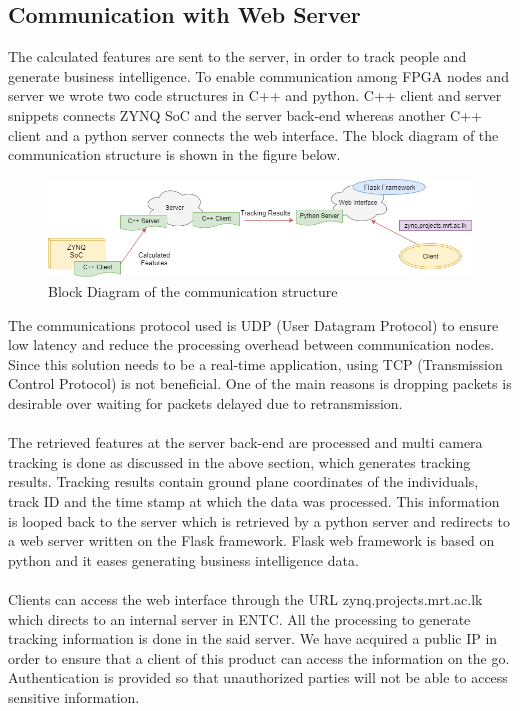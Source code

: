 \documentclass[12pt,a4paper]{report}
\begin{document}
\subsection{Communication with Web Server}
The calculated features are sent to the server, in order to track people and generate business intelligence. To enable communication among FPGA nodes and server we wrote two code structures in C++ and python. C++ client and server snippets connects ZYNQ SoC and the server back-end whereas another C++ client and a python server connects the web interface. The block diagram of the communication structure is shown in the figure below.
\begin{figure}[H]
\includegraphics[width=\textwidth]{comm.png}
\centering
\caption{Block Diagram of the communication structure}
\label{flask}
\end{figure}
The communications protocol used is UDP (User Datagram Protocol) to ensure low latency and reduce the processing overhead between communication nodes. Since this solution needs to be a real-time application, using TCP (Transmission Control Protocol) is not beneficial. One of the main reasons is dropping packets is desirable over waiting for packets delayed due to retransmission.\\\\
The retrieved features at the server back-end are processed and multi camera tracking is done as discussed in the above section, which generates tracking results. Tracking results contain ground plane coordinates of the individuals, track ID and the time stamp at which the data was processed. This information is looped back to the server which is retrieved by a python server and redirects to a web server written on the Flask framework. Flask web framework is based on python and it eases generating business intelligence data.\\\\
Clients can access the web interface through the URL zynq.projects.mrt.ac.lk which directs to an internal server in ENTC. All the processing to generate tracking information is done in the said server. We have acquired a public IP in order to ensure that a client of this product can access the information on the go. Authentication is provided so that unauthorized parties will not be able to access sensitive information.
\end{document}
